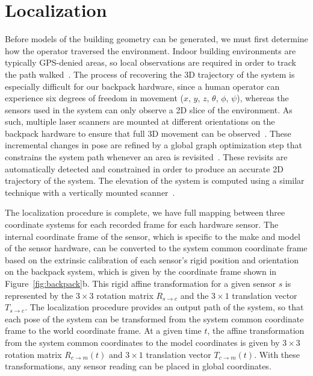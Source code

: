 \documentclass[12pt,onecolumn,oneside]{book}
\begin{document}
\section{Localization}
\label{sec:localization}

Before models of the building geometry can be generated, we must first determine how the operator traversed the environment.  Indoor building environments are typically GPS-denied areas, so local observations are required in order to track the path walked~\cite{Backpack,Localization,NickJournal}.  The process of recovering the 3D trajectory of the system is especially difficult for our backpack hardware, since a human operator can experience six degrees of freedom in movement ($x$, $y$, $z$, $\theta$, $\phi$, $\psi$), whereas the sensors used in the system can only observe a 2D slice of the environment.  As such, multiple laser scanners are mounted at different orientations on the backpack hardware to ensure that full 3D movement can be observed~\cite{NickJournal}.  These incremental changes in pose are refined by a global graph optimization step that constrains the system path whenever an area is revisited~\cite{toro07}.  These revisits are automatically detected and constrained in order to produce an accurate 2D trajectory of the system.  The elevation of the system is computed using a similar technique with a vertically mounted scanner~\cite{Backpack}.

The localization procedure is complete, we have full mapping between three coordinate systems for each recorded frame for each hardware sensor.  The internal coordinate frame of the sensor, which is specific to the make and model of the sensor hardware, can be converted to the system common coordinate frame based on the extrinsic calibration of each sensor's rigid position and orientation on the backpack system, which is given by the coordinate frame shown in Figure~\ref{fig:backpack}b.  This rigid affine transformation for a given sensor $s$ is represented by the $3 \times 3$ rotation matrix $R_{s\rightarrow c}$ and the $3 \times 1$ translation vector $T_{s\rightarrow c}$.  The localization procedure provides an output path of the system, so that each pose of the system can be transformed from the system common coordinate frame to the world coordinate frame.  At a given time $t$, the affine transformation from the system common coordinates to the model coordinates is given by $3 \times 3$ rotation matrix $R_{c\rightarrow m}(t)$ and $3 \times 1$ translation vector $T_{c\rightarrow m}(t)$.  With these transformations, any sensor reading can be placed in global coordinates.
\end{document}
